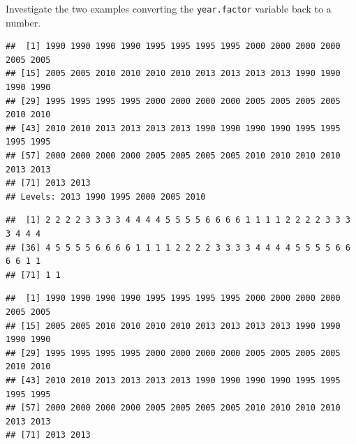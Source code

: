\documentclass[]{book}
\makeatletter
\newenvironment{Shaded}{\begin{snugshade}}{\end{snugshade}}
\newcommand{\KeywordTok}[1]{\textcolor[rgb]{0.13,0.29,0.53}{\textbf{#1}}}
\newcommand{\NormalTok}[1]{#1}
\newcommand{\OperatorTok}[1]{\textcolor[rgb]{0.81,0.36,0.00}{\textbf{#1}}}
\newcommand{\StringTok}[1]{\textcolor[rgb]{0.31,0.60,0.02}{#1}}
\newenvironment{kframe}{%
\medskip{}
\setlength{\fboxsep}{.8em}
 \def\at@end@of@kframe{}%
 \ifinner\ifhmode%
  \def\at@end@of@kframe{\end{minipage}}%
  \begin{minipage}{\columnwidth}%
 \fi\fi%
 \def\FrameCommand##1{\hskip\@totalleftmargin \hskip-\fboxsep
 \colorbox{shadecolor}{##1}\hskip-\fboxsep
     \hskip-\linewidth \hskip-\@totalleftmargin \hskip\columnwidth}%
 \MakeFramed {\advance\hsize-\width
   \@totalleftmargin\z@ \linewidth\hsize
   \@setminipage}}%
 {\par\unskip\endMakeFramed%
 \at@end@of@kframe}
\renewenvironment{Shaded}{\begin{kframe}}{\end{kframe}}
\theoremstyle{definition}
\theoremstyle{definition}
\theoremstyle{definition}
\theoremstyle{remark}
\makeatother
\begin{document}
Investigate the two examples converting the \texttt{year.factor}
variable back to a number.

\begin{Shaded}
\end{Shaded}

\begin{verbatim}
##  [1] 1990 1990 1990 1990 1995 1995 1995 1995 2000 2000 2000 2000 2005 2005
## [15] 2005 2005 2010 2010 2010 2010 2013 2013 2013 2013 1990 1990 1990 1990
## [29] 1995 1995 1995 1995 2000 2000 2000 2000 2005 2005 2005 2005 2010 2010
## [43] 2010 2010 2013 2013 2013 2013 1990 1990 1990 1990 1995 1995 1995 1995
## [57] 2000 2000 2000 2000 2005 2005 2005 2005 2010 2010 2010 2010 2013 2013
## [71] 2013 2013
## Levels: 2013 1990 1995 2000 2005 2010
\end{verbatim}

\begin{Shaded}
\end{Shaded}

\begin{verbatim}
##  [1] 2 2 2 2 3 3 3 3 4 4 4 4 5 5 5 5 6 6 6 6 1 1 1 1 2 2 2 2 3 3 3 3 4 4 4
## [36] 4 5 5 5 5 6 6 6 6 1 1 1 1 2 2 2 2 3 3 3 3 4 4 4 4 5 5 5 5 6 6 6 6 1 1
## [71] 1 1
\end{verbatim}

\begin{Shaded}
\end{Shaded}

\begin{verbatim}
##  [1] 1990 1990 1990 1990 1995 1995 1995 1995 2000 2000 2000 2000 2005 2005
## [15] 2005 2005 2010 2010 2010 2010 2013 2013 2013 2013 1990 1990 1990 1990
## [29] 1995 1995 1995 1995 2000 2000 2000 2000 2005 2005 2005 2005 2010 2010
## [43] 2010 2010 2013 2013 2013 2013 1990 1990 1990 1990 1995 1995 1995 1995
## [57] 2000 2000 2000 2000 2005 2005 2005 2005 2010 2010 2010 2010 2013 2013
## [71] 2013 2013
\end{verbatim}
\end{document}
